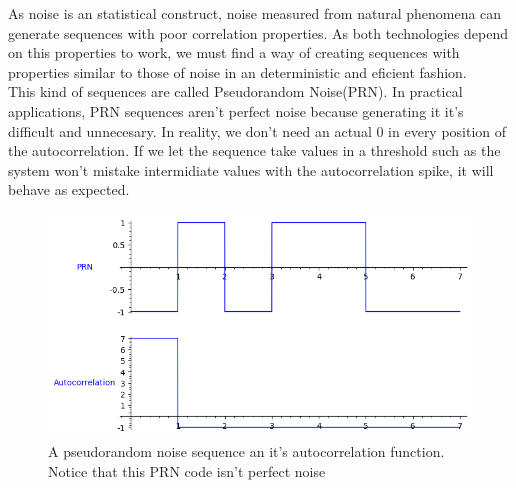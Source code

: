 As noise is an statistical construct, noise measured from natural phenomena
can generate sequences with poor correlation properties. As both technologies
depend on this properties to work, we must find a way of creating sequences
with properties similar to those of noise in an deterministic and eficient
fashion.\\

This kind of sequences are called Pseudorandom Noise(PRN). In practical
applications, PRN sequences aren't perfect noise because generating it it's
difficult and unnecesary. In reality, we don't need an actual 0 in every
position of the autocorrelation. If we let the sequence take values in a
threshold such as the system won't mistake intermidiate values with the
autocorrelation spike, it will behave as expected.

\begin{figure}[ht!] %
\begin{center}
\includegraphics[width=0.7\linewidth]{Chapters/Introduction/signals_prn}
\end{center}
\caption{A pseudorandom noise sequence an it's autocorrelation function.
Notice that this PRN code isn't perfect noise}
\label{introduction_signals_autocorrelation}
\end{figure}


